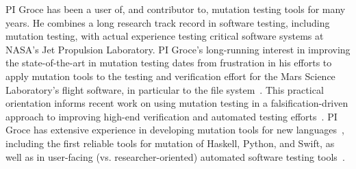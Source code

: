 PI Groce has been a user of, and contributor to, mutation testing tools for many years.  He combines a long research track record in software testing, including mutation testing, with actual experience testing critical software systems at NASA's Jet Propulsion Laboratory.  PI Groce's long-running interest in improving the state-of-the-art in mutation testing dates from frustration in his efforts to apply mutation tools to the testing and verification effort for the Mars Science Laboratory's flight software, in particular to the file system~\cite{ICSEDiff,CFV08,AMAI}.  This practical orientation informs recent work on using mutation testing in a falsification-driven approach to improving high-end verification and automated testing efforts~\cite{groce2015verified,groce2018verified,mutKernel}.  PI Groce has extensive experience in developing mutation tools for new languages~\cite{le2014mucheck,muupi,regexpMut}, including the first reliable tools for mutation of Haskell, Python, and Swift, as well as in user-facing (vs. researcher-oriented) automated software testing tools~\cite{tstlsttt,DeepState}.